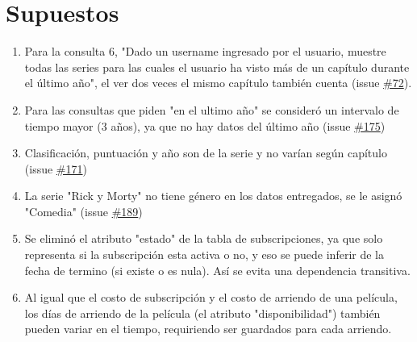 \documentclass{article}
\begin{document}
\section{Supuestos}
\begin{enumerate}
    \item Para la consulta 6, "Dado un username ingresado por el usuario, muestre todas las series para las cuales el usuario ha visto más de un capítulo durante el último año", el ver dos veces el mismo capítulo también cuenta (issue \href{https://github.com/IIC2413/Syllabus-2023-2/issues/172}{\#72}).
    \item Para las consultas que piden "en el ultimo año" se consideró un intervalo de tiempo mayor (3 años), ya que no hay datos del último año (issue \href{https://github.com/IIC2413/Syllabus-2023-2/issues/175}{\#175})
    \item Clasificación, puntuación y año son de la serie y no varían según capítulo (issue \href{https://github.com/IIC2413/Syllabus-2023-2/issues/171}{\#171})
    \item La serie "Rick  y Morty" no tiene género en los datos entregados, se le asignó "Comedia" (issue \href{https://github.com/IIC2413/Syllabus-2023-2/issues/189}{\#189})
    \item Se eliminó el atributo "estado" de la tabla de subscripciones, ya que solo representa si la subscripción esta activa o no, y eso se puede inferir de la fecha de termino (si existe o es nula). Así se evita una dependencia transitiva.
    \item Al igual que el costo de subscripción y el costo de arriendo de una película, los días de arriendo de la película (el atributo "disponibilidad") también pueden variar en el tiempo, requiriendo ser guardados para cada arriendo.
\end{enumerate}
\end{document}
